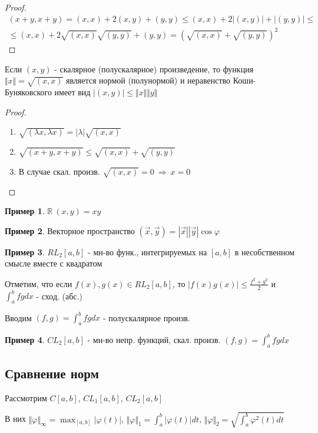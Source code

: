 \documentclass{article}
\theoremstyle{definition}
\numberwithin{theorem}{section}
\numberwithin{lemma}{section}
\numberwithin{definition}{section}
\numberwithin{corollary}{section}
\newtheorem*{eg}{Пример}
\numberwithin{equation}{section}
\let\phi\varphi
\let\implies\Rightarrow
\newcommand\R{\ensuremath{\mathbb{R}}}
\begin{document}
\begin{proof}
  \begin{gather*}
    (x+y,x+y)=(x,x)+2(x,y)+(y,y) \le (x,x) + 2|(x,y)|+|(y,y)| \le \\ 
    \le (x,x)+2\sqrt{(x,x)}\sqrt{(y,y)}+(y,y)=(\sqrt{(x,x)}+\sqrt{(y,y)})^{2}
  \end{gather*}
\end{proof}
\begin{lemma}
  Если $(x,y)$ - скалярное (полускалярное) произведение, то
  функция $\Vert x \Vert=\sqrt{(x,x)}$ является нормой (полунормой)
  и неравенство Коши-Буняковского имеет вид $|(x,y)|\le\Vert x \Vert\Vert y \Vert$
\end{lemma}
\begin{proof}
  \phantom{.}

  \begin{enumerate}
    \item $\sqrt{(\lambda x,\lambda x)}=|\lambda|\sqrt{(x,x)}$ 
    \item $\sqrt{(x+y,x+y)}\le \sqrt{(x,x)} + \sqrt{(y,y)}$
    \item В случае скал. произв. $\sqrt{(x,x)}=0 \ \implies \ x=0$
  \end{enumerate}
\end{proof}
\begin{eg}
  $\R \ (x,y)=xy$
\end{eg}
\begin{eg}
  Векторное пространство $(\vec{x},\vec{y})=|\vec{x}||\vec{y}|\cos \phi$
\end{eg}
\begin{eg}
  $RL_2[a,b]$ - мн-во функ., интегрируемых на $[a,b]$ в несобственном смысле вместе с квадратом

  Отметим, что если $f(x), g(x) \in RL_2[a,b]$, то $|f(x)g(x)|\le \frac{f^{2}+g^{2}}{2}$ и 
  $\int_{a}^{b}fgdx$ - сход. (абс.)

  Вводим $(f,g)=\int_{a}^{b}fgdx$ - полускалярное произв.
\end{eg}
\begin{eg}
  $CL_2[a,b]$ - мн-во непр. функций, скал. произв. $(f,g)=\int_{a}^{b}fgdx$
\end{eg}

\subsection{Сравнение норм}
Рассмотрим $C[a,b]$, $CL_1[a,b]$, $CL_2[a,b]$

В них $\Vert \phi \Vert_{\infty}=\max_{[a,b]}|\phi(t)|$, $\Vert \phi \Vert_{1}=\int_{a}^{b}|\phi(t)|dt$,
$\Vert \phi \Vert_{2}=\sqrt{\int_{a}^{b}\phi^{2}(t)dt}$
\end{document}
